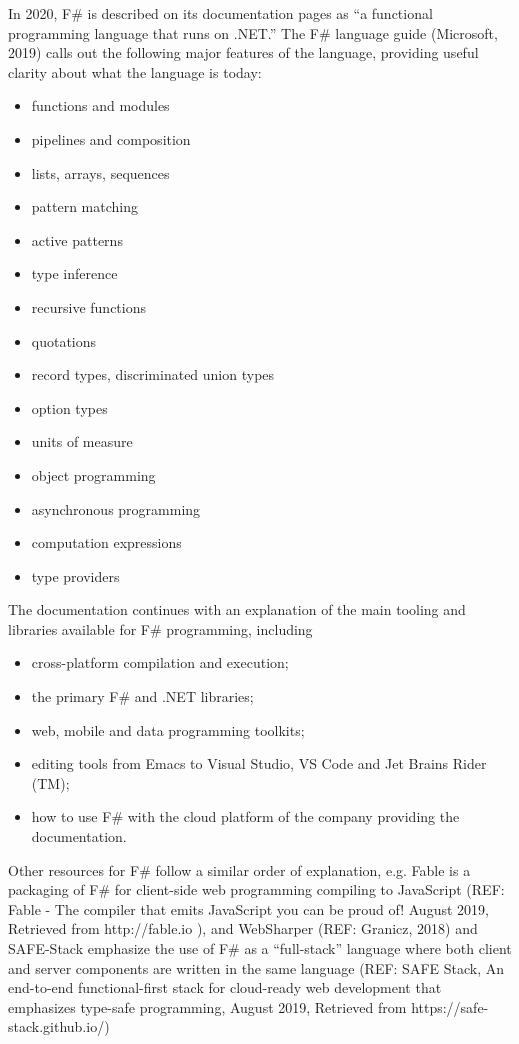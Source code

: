 \documentclass[acmsmall,review]{acmart}\settopmatter{printfolios=true,printccs=false,printacmref=false}
\begin{document}
In 2020, F\# is described on its documentation pages as “a functional programming language that runs on .NET.” The F\# language guide (Microsoft, 2019) calls out the following major features of the language, providing useful clarity about what the language is today:
\begin{itemize}
\item functions and modules
\item pipelines and composition
\item lists, arrays, sequences
\item pattern matching 
\item active patterns 
\item type inference
\item recursive functions
\item quotations
\item record types, discriminated union types
\item option types
\item units of measure
\item object programming
\item asynchronous programming
\item computation expressions
\item type providers
\end{itemize}
The documentation continues with an explanation of the main tooling and libraries available for F\# programming, including
\begin{itemize}
\item cross-platform compilation and execution;
\item the primary F\# and .NET libraries;
\item web, mobile and data programming toolkits;
\item editing tools from Emacs to Visual Studio, VS Code and Jet Brains Rider (TM);
\item how to use F\# with the cloud platform of the company providing the documentation.
\end{itemize}
Other resources for F\# follow a similar order of explanation, e.g. Fable  is a packaging of F\# for client-side web programming compiling to JavaScript (REF: Fable - The compiler that emits JavaScript you can be proud of! August 2019, Retrieved from http://fable.io ), and WebSharper (REF: Granicz, 2018) and SAFE-Stack  emphasize the use of F\# as a “full-stack” language where both client and server components are written in the same language (REF: SAFE Stack, An end-to-end functional-first stack for cloud-ready web development that emphasizes type-safe programming, August 2019,  Retrieved from https://safe-stack.github.io/)
\end{document}
